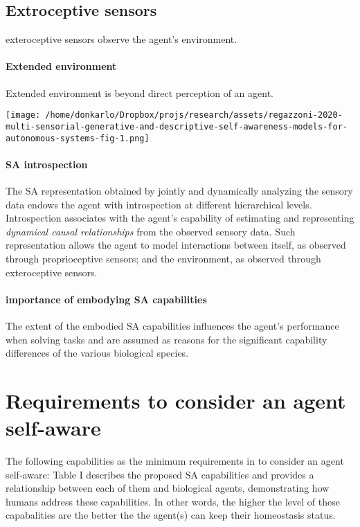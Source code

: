 \documentclass{article}
\begin{document}
		\subsection{Extroceptive sensors}
		exteroceptive sensors observe the agent's environment.
			\paragraph{Extended environment}
				Extended environment is beyond direct perception of an agent.
	\begin{figure*}
		\centering
		\texttt{[image: /home/donkarlo/Dropbox/projs/research/assets/regazzoni-2020-multi-sensorial-generative-and-descriptive-self-awareness-models-for-autonomous-systems-fig-1.png]}
		\caption{\citet{regazzoni-2020-multi-sensorial-generative-and-descriptive-self-awareness-models-for-autonomous-systems}}
		\label{fig:regazzoni-2020-multi-sensorial-generative-and-descriptive-self-awareness-models-for-autonomous-systems-fig-1.jpg}
	\end{figure*}
		
	\paragraph{SA introspection}  The SA representation obtained by jointly and dynamically analyzing the sensory data endows the agent with introspection at different hierarchical levels. Introspection associates with the agent’s capability of estimating and representing \emph{dynamical causal relationships} from the observed sensory data. Such representation allows the agent to model interactions between itself, as observed through proprioceptive sensors; and the environment, as observed through exteroceptive sensors.
		
	\paragraph{importance of embodying SA capabilities}The extent of the embodied SA capabilities influences the agent's performance when solving tasks and are assumed as reasons for the significant capability differences of the various biological species. 
		
	\section{Requirements to consider an agent self-aware} \label{sec:minimum-requirements-to-consider-an-agent-homostatis} The following capabilities as the minimum requirements in to consider an agent self-aware:
		\citet{regazzoni-2020-multi-sensorial-generative-and-descriptive-self-awareness-models-for-autonomous-systems} Table I describes the proposed SA capabilities and provides a relationship between each of them and biological agents, demonstrating how humans address these capabilities. In other words, the higher the level of these capabalities are the better the the agent(s) can keep their homeostasis status.
\end{document}
